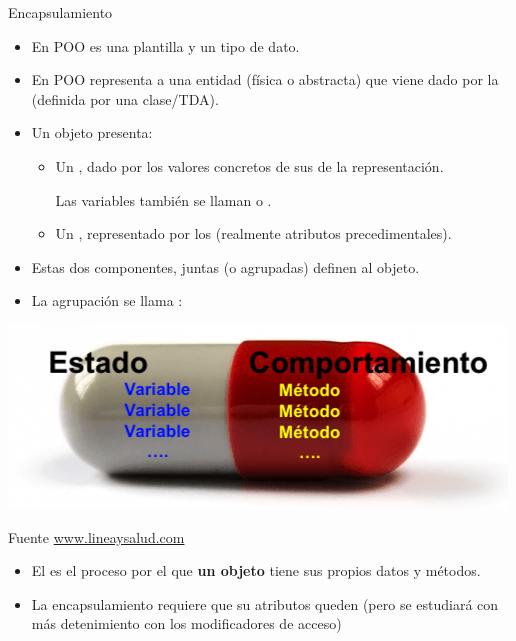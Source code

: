 \documentclass[10pt,envcountsect,spanish]{beamer}
\begin{document}
\begin{frame}{Encapsulamiento} 

\begin{itemize}
\item En POO  es una plantilla y  un tipo de dato.
\item En POO  representa a una entidad (física o abstracta) que viene dado por la  (definida por una clase/TDA).

\item Un objeto presenta:
\begin{itemize}
\item Un , dado por los valores concretos de sus  de la representación.

Las variables también se llaman  o .

\item Un , representado por los  (realmente atributos precedimentales).
\end{itemize}

\item Estas dos componentes, juntas (o agrupadas) definen al objeto. 

\item La agrupación se llama :

\end{itemize}

\centerline{\includegraphics[width=.5\textwidth]{fig/capsula}}
\vskip -0.5cm
\centerline{ \tiny Fuente \href{https://www.lineaysalud.com/que-es/capsulas-de-gelatina}{www.lineaysalud.com}}

\begin{itemize}
\item El  es el proceso por el que \textbf{un objeto} tiene sus propios datos y métodos.

\item La encapsulamiento requiere que su atributos queden  (pero se estudiará con más detenimiento con los modificadores de acceso)

\end{itemize}
\end{frame}
\end{document}
